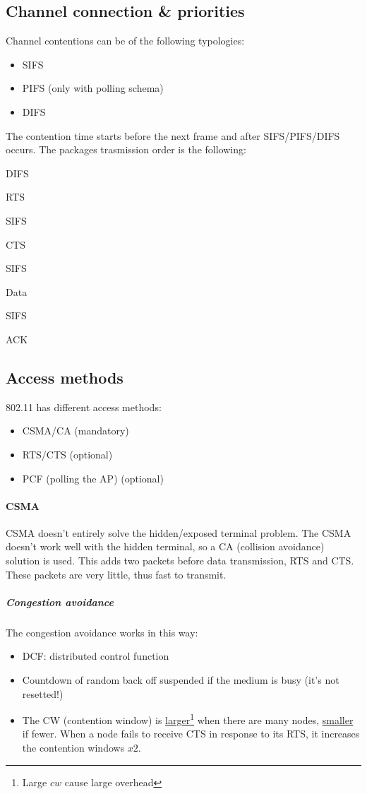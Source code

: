 \subsection{Channel connection \& priorities}
Channel contentions can be of the following typologies:
\begin{itemize}
\item SIFS
\item PIFS (only with polling schema)
\item DIFS
\end{itemize}

The contention time starts before the next frame and after SIFS/PIFS/DIFS
occurs.
The packages trasmission order is the following:
\begin{AutoMultiColEnumerate}
\item DIFS
\item RTS
\item SIFS
\item CTS
\item SIFS
\item Data
\item SIFS
\item ACK
\end{AutoMultiColEnumerate}

\subsection{Access methods}
802.11 has different access methods:
\begin{itemize}
\item CSMA/CA (mandatory)
\item RTS/CTS (optional)
\item PCF (polling the AP) (optional)
\end{itemize}

\paragraph*{CSMA} CSMA doesn't entirely solve the hidden/exposed terminal
problem. The CSMA doesn't work well with the hidden terminal, so a CA
(collision avoidance) solution is used. This adds two packets before data
transmission, RTS and CTS. These packets are very little, thus fast to transmit.

\subparagraph*{Congestion avoidance} The congestion avoidance works in this way:
\begin{itemize}
\item DCF: distributed control function
\item Countdown of random back off suspended if the medium is busy (it's not
  resetted!)
\item The CW (contention window) is \underline{larger}\footnote{Large $cw$ cause
  large overhead} when there are many nodes, \underline{smaller} if fewer. When
  a node fails to receive CTS in response to its RTS, it increases the
  contention windows $x2$.
\end{itemize}

